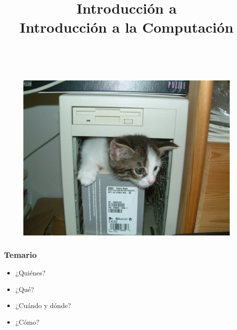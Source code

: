 \documentclass[11pt,a4paper,spanish]{beamer}
\title{Introducción a\\
\textbf{Introducción a la Computación}}
\author{}
\date{}
\begin{document}
\begin{frame}[noframenumbering]

    \maketitle
    \centering
    \vspace{-8em}~
    \begin{figure}
    \includegraphics[height=0.65\textheight]{img/ckitten.jpg}
        \captionsetup{textfont=tiny,labelformat=empty}
        \caption{\ccbysa\cite{ckitten}}
    \end{figure}

\end{frame}

\begin{frame}

    \frametitle{Temario}

\begin{itemize}

\item ¿Quiénes?

\item ¿Qué?

\item ¿Cuándo y dónde?

\item ¿Cómo?

\end{itemize}

\end{frame}
\end{document}
